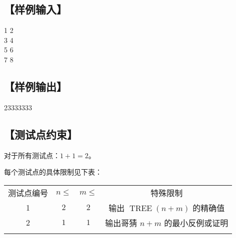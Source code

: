 \documentclass{statement}
\begin{document}
    \subsection[样例输入]{【样例输入】}
    \begin{example}
1 2\\
3 4\\
5 6\\
7 8
    \end{example}

    \subsection[样例输出]{【样例输出】}
    \begin{example}
23333333
    \end{example}

    \subsection[测试点约束]{【测试点约束】}
    对于所有测试点：$1+1=2$。

    每个测试点的具体限制见下表：
    \begin{center}
        \begin{tabular}{c|c|c|c}
            \Xhline{5\arrayrulewidth}
            测试点编号 & $n\leq$ & $m\leq$ & 特殊限制\\
            \Xhline{3\arrayrulewidth}
            1 & $2$ & $2$ & 输出 $\operatorname{TREE}(n+m)$ 的精确值\\
            \hline
            2 & $1$ & $1$ & 输出哥猜 $n+m$ 的最小反例或证明\\
            \Xhline{5\arrayrulewidth}
        \end{tabular}
    \end{center}
\end{document}
